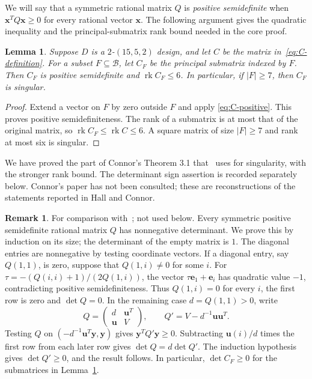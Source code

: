 \documentclass[11pt]{article}
\newcommand\cB{{\mathcal B}}
\newcommand\Zu{{\mathbf u}}
\newcommand\Zy{{\mathbf y}}
\newcommand\Zx{{\mathbf x}}
\newcommand\opk[1]{\mathop{\mathrm{#1}}\nolimits}
\newcommand\sbs{\subseteq}
\newcommand\pmat[1]{\begin{pmatrix} #1 \end{pmatrix}}
\newcommand\rk{\opk{rk}}
\newtheorem{lemma}[theorem]{Lemma}
\theoremstyle{definition}
\newtheorem{remark}[theorem]{Remark}
\newcommand{\Ze}{{\mathbf e}}
\begin{document}
We will say that a symmetric rational matrix $Q$ is \emph{positive
semidefinite} when $\Zx^TQ\Zx\ge0$ for every rational vector $\Zx$.
The following argument gives the quadratic inequality and the
principal-submatrix rank bound needed in the core proof.

\begin{lemma}\label{lem:principal}
Suppose $D$ is a $2$-$(15,5,2)$ design, and let $C$ be the matrix
in~\eqref{eq:C-definition}. For a subset $F\sbs\cB$, let $C_F$ be the
principal submatrix indexed by $F$. Then $C_F$ is positive semidefinite
and $\rk C_F\le6$. In particular, if $|F|\ge7$, then $C_F$ is singular.
\end{lemma}
\begin{proof}
Extend a vector on $F$ by zero outside $F$ and apply
\eqref{eq:C-positive}. This proves positive semidefiniteness.
The rank of a submatrix is at most that of the original matrix, so
$\rk C_F\le\rk C\le6$. A square matrix of size $|F|\ge7$ and rank
at most six is singular.
\end{proof}

We have proved the part of Connor's Theorem 3.1 that~\cite{HC} uses
for singularity, with the stronger rank bound. The determinant sign
assertion is recorded separately below. Connor's paper has not been
consulted; these are reconstructions of the statements reported in
Hall and Connor.

\begin{remark}\label{rem:det-nonneg}
For comparison with~\cite{HC}; not used below.
Every symmetric positive semidefinite rational
matrix $Q$ has nonnegative determinant. We prove this by induction on
its size; the determinant of the empty matrix is $1$. The diagonal
entries are nonnegative by testing coordinate vectors. If a diagonal
entry, say $Q(1,1)$, is zero, suppose that $Q(1,i)\ne0$ for some $i$.
For $\tau=-(Q(i,i)+1)/(2Q(1,i))$, the vector
$\tau\Ze_1+\Ze_i$ has quadratic value $-1$, contradicting positive
semidefiniteness. Thus $Q(1,i)=0$ for every $i$, the first row is zero
and $\det Q=0$. In the remaining case $d=Q(1,1)>0$, write
\[
 Q=\pmat{d&\Zu^T\\\Zu&V},\qquad
 Q'=V-d^{-1}\Zu\Zu^T.
\]
Testing $Q$ on $(-d^{-1}\Zu^T\Zy,\Zy)$ gives
$\Zy^TQ'\Zy\ge0$. Subtracting $\Zu(i)/d$ times the first row from
each later row gives $\det Q=d\det Q'$. The induction hypothesis gives
$\det Q'\ge0$, and the result follows. In particular,
$\det C_F\ge0$ for the submatrices in Lemma~\ref{lem:principal}.
\end{remark}
\end{document}
